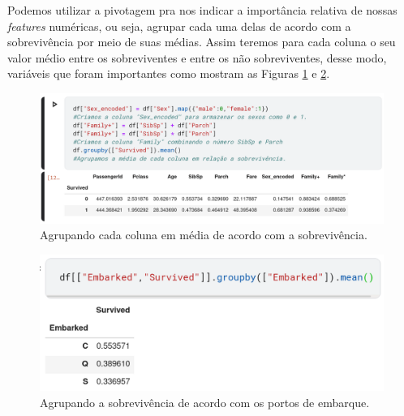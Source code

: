 Podemos utilizar a pivotagem pra nos indicar a importância relativa de nossas \emph{features} numéricas, ou seja, agrupar cada uma delas de acordo com a sobrevivência por meio de suas médias. Assim teremos para cada coluna o seu valor médio entre os sobreviventes e entre os não sobreviventes, desse modo, variáveis que foram importantes como mostram as Figuras \ref{df.groupby} e \ref{embarked.groupby}.

\begin{figure}[H]
\centering
\includegraphics[width=\textwidth]{Figures/df.groupby.png}
\caption{\label{df.groupby}Agrupando cada coluna em média de acordo com a sobrevivência.}
\end{figure}

\begin{figure}[H]
\centering
\includegraphics[width=\textwidth]{Figures/embarked.png}
\caption{\label{embarked.groupby}Agrupando a sobrevivência de acordo com os portos de embarque.}
\end{figure}

